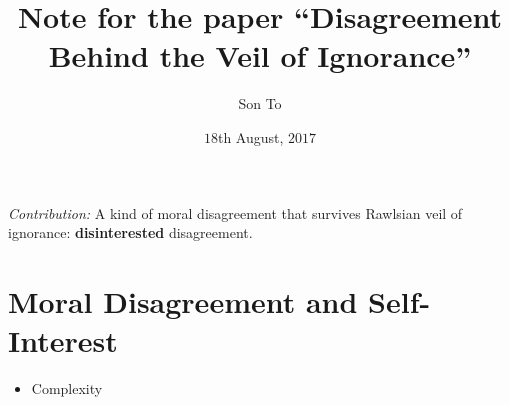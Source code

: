 \documentclass[a4paper,11pt]{article}
\newcommand{\note}[1]{\textsl{#1}}
\newcommand{\bold}[1]{\textbf{#1}}
\begin{document}
  \title{Note for the paper ``Disagreement
  Behind the Veil of Ignorance''}
  \author{Son To}
  \date{$18$th August, $2017$}

  \maketitle

  \note{Contribution:} A kind of moral disagreement
  that survives Rawlsian veil of ignorance: \bold{%
  disinterested} disagreement.
  \section{Moral Disagreement and Self-Interest}
  \begin{itemize}
    \item Complexity
  \end{itemize}
\end{document}
